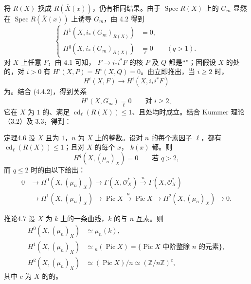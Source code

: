 将 $R(X)$ 换成 $R(\overline X(x))$，仍有相同结果。由于 $\operatorname{Spec}R(X)$ 上的 $G_m$ 显然在 $\operatorname{Spec}R(\overline X(x))$ 上诱导 $G_m$，由 4.2 得到
\[
\left\{\begin{aligned}
H^1(X,i_*(G_m)_{R(X)})&=0,\\
H^q(X,i_*(G_m)_{R(X)})&\underset{\ell}{=}0\qquad(q>1).
\end{aligned}\right.
\tag{4.4.2}
\]
对 $X$ 上任意 $F$，由 4.1 可知， $F\to i_*i^*F$ 的核 $P$ 及 $Q$ 都是“”；因假设 $X$ 的处的，对 $i>0$ 有 $H^i(X,P)=H^i(X,Q)=0$。由立即推出，当 $i\ge2$ 时，
\[
H^i(X,F)\longrightarrow H^i(X,i_*i^*F)
\]
为。结合 (4.4.2)，得到关系
\[
H^i(X,G_m)\underset{\ell}{=}0\qquad\text{对 }i\ge2,
\tag{4.5}
\]
它在 $X$ 为 $1$ 的、满足 $\operatorname{cd}_\ell(R(X))\le1$、且处均时成立。结合 Kummer 理论（3.2）及 3.3，得到：
\begin{SGAresult}{定理}{4.6}
设 $X$ 且为 $1$，$n$ 为 $X$ 上的整数。设对 $n$ 的每个素因子 $\ell$，都有 $\operatorname{cd}_\ell(R(X))\le1$；且对 $X$ 的每个 $x$， $k(x)$ 都。则
\[
H^q(X,(\mu_n)_X)=0\qquad\text{若 }q>2,
\]
而 $q\le2$ 时的由以下给出：
\[
\begin{aligned}
0&\longrightarrow H^0(X,(\mu_n)_X)\longrightarrow\Gamma(X,\mathcal O_X^*)
 \xrightarrow{n}\Gamma(X,\mathcal O_X^*)\\
&\longrightarrow H^1(X,(\mu_n)_X)\longrightarrow\operatorname{Pic}X
 \xrightarrow{n}\operatorname{Pic}X\longrightarrow H^2(X,(\mu_n)_X)\longrightarrow0.
\end{aligned}
\]
\end{SGAresult}
\begin{SGAresult}{推论}{4.7}
设 $X$ 为 $k$ 上的一条曲线，$k$ 的与 $n$ 互素。则
\[
\begin{aligned}
H^0(X,(\mu_n)_X)&\simeq\mu_n(k),\\
H^1(X,(\mu_n)_X)&\simeq{}_n(\operatorname{Pic}X)
 =\{\operatorname{Pic}X\text{ 中阶整除 }n\text{ 的元素}\},\\
H^2(X,(\mu_n)_X)&\simeq(\operatorname{Pic}X)/n\simeq(\mathbb Z/n\mathbb Z)^c,
\end{aligned}
\]
其中 $c$ 为 $X$ 的的。
\end{SGAresult}
